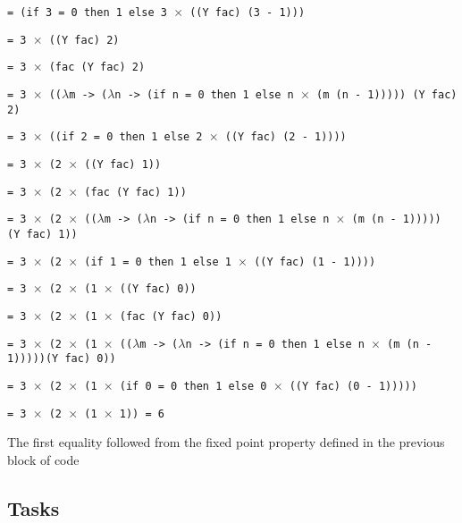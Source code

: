 \documentclass[11pt]{article}
\begin{document}
\hspace{1cm}\texttt{= (if 3 = 0 then 1 else 3 $\times$ ((Y fac) (3 - 1)))}

\hspace{1cm}\texttt{= 3 $\times$ ((Y fac) 2)}

\hspace{1cm}\texttt{= 3 $\times$ (fac (Y fac) 2)}

\hspace{1cm}\texttt{= 3 $\times$ (($\lambda$m -> ($\lambda$n -> (if n = 0 then 1 else n $\times$ (m (n - 1))))) (Y fac) 2)}

\hspace{1cm}\texttt{= 3 $\times$ ((if 2 = 0 then 1 else 2 $\times$ ((Y fac) (2 - 1))))}

\hspace{1cm}\texttt{= 3 $\times$ (2 $\times$ ((Y fac) 1))}

\hspace{1cm}\texttt{= 3 $\times$ (2 $\times$ (fac (Y fac) 1))}

\hspace{1cm}\texttt{= 3 $\times$ (2 $\times$ (($\lambda$m -> ($\lambda$n -> (if n = 0 then 1 else n $\times$ (m (n - 1))))) (Y fac) 1))}

\hspace{1cm}\texttt{= 3 $\times$ (2 $\times$ (if 1 = 0 then 1 else 1 $\times$ ((Y fac) (1 - 1))))}

\hspace{1cm}\texttt{= 3 $\times$ (2 $\times$ (1 $\times$ ((Y fac) 0))}

\hspace{1cm}\texttt{= 3 $\times$ (2 $\times$ (1 $\times$ (fac (Y fac) 0))}

\hspace{1cm}\texttt{= 3 $\times$ (2 $\times$ (1 $\times$ (($\lambda$m -> ($\lambda$n -> (if n = 0 then 1 else n $\times$ (m (n - 1)))))(Y fac) 0))}

\hspace{1cm}\texttt{= 3 $\times$ (2 $\times$ (1 $\times$ (if 0 = 0 then 1 else 0 $\times$ ((Y fac) (0 - 1)))))}

\hspace{1cm}\texttt{= 3 $\times$ (2 $\times$ (1 $\times$ 1)) = 6}
\normalsize

The first equality followed from the fixed point property defined in the previous block of code

\subsection{Tasks}
\end{document}
